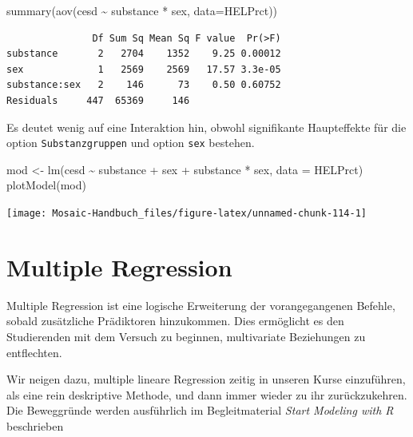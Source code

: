 \documentclass[
  ngerman,
]{scrbook}
\newenvironment{Shaded}{\begin{snugshade}}{\end{snugshade}}
\newcommand{\AttributeTok}[1]{\textcolor[rgb]{0.77,0.63,0.00}{#1}}
\newcommand{\FunctionTok}[1]{\textcolor[rgb]{0.00,0.00,0.00}{#1}}
\newcommand{\NormalTok}[1]{#1}
\newcommand{\OtherTok}[1]{\textcolor[rgb]{0.56,0.35,0.01}{#1}}
\newcommand{\SpecialCharTok}[1]{\textcolor[rgb]{0.00,0.00,0.00}{#1}}
\newenvironment{note}[1]
  {
  \begin{itemize}
  \renewcommand{\labelitemi}{
    \raisebox{-.01\height}[0pt][0pt]{
      {\setkeys{Gin}{width=7em,keepaspectratio}
        {\normalsize \textcolor{dark-fom-green}\faHashtag}}
        }
  }
  \begin{blackbox}
   \item
    }
    {
  \end{blackbox}
  \end{itemize}
  }
\begin{document}
\begin{Shaded}
\begin{Highlighting}[]
\FunctionTok{summary}\NormalTok{(}\FunctionTok{aov}\NormalTok{(cesd }\SpecialCharTok{\textasciitilde{}}\NormalTok{ substance }\SpecialCharTok{*}\NormalTok{ sex, }\AttributeTok{data=}\NormalTok{HELPrct))}
\end{Highlighting}
\end{Shaded}

\begin{verbatim}
               Df Sum Sq Mean Sq F value  Pr(>F)
substance       2   2704    1352    9.25 0.00012
sex             1   2569    2569   17.57 3.3e-05
substance:sex   2    146      73    0.50 0.60752
Residuals     447  65369     146                
\end{verbatim}

Es deutet wenig auf eine Interaktion hin, obwohl signifikante Haupteffekte für die option \texttt{Substanzgruppen} und option \texttt{sex} bestehen.

\begin{Shaded}
\begin{Highlighting}[]
\NormalTok{mod }\OtherTok{\textless{}{-}} \FunctionTok{lm}\NormalTok{(cesd }\SpecialCharTok{\textasciitilde{}}\NormalTok{ substance }\SpecialCharTok{+}\NormalTok{ sex }\SpecialCharTok{+}\NormalTok{ substance }\SpecialCharTok{*}\NormalTok{ sex, }\AttributeTok{data =}\NormalTok{ HELPrct)}
\FunctionTok{plotModel}\NormalTok{(mod)}
\end{Highlighting}
\end{Shaded}

\begin{center}\texttt{[image: Mosaic-Handbuch\_files/figure-latex/unnamed-chunk-114-1]} \end{center}

\hypertarget{multiple-regression}{%
\section{Multiple Regression}\label{multiple-regression}}

Multiple Regression ist eine logische Erweiterung der vorangegangenen Befehle, sobald zusätzliche Prädiktoren hinzukommen. Dies ermöglicht es den Studierenden mit dem Versuch zu beginnen, multivariate Beziehungen zu entflechten.

\begin{note}{note}
Wir neigen dazu, multiple lineare Regression zeitig in unseren Kurse einzuführen, als eine rein deskriptive Methode, und dann immer wieder zu ihr zurückzukehren. Die Beweggründe werden ausführlich im Begleitmaterial \emph{Start Modeling with R} \autocite{ModelingR} beschrieben

\end{note}
\end{document}
